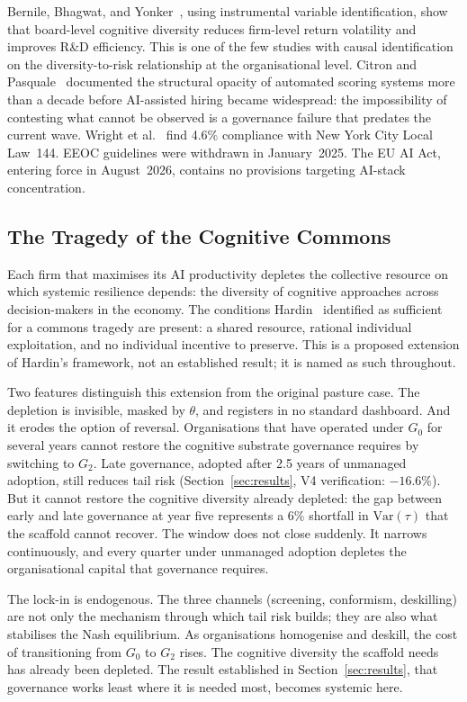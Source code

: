 \documentclass[11pt,a4paper]{article}
\begin{document}
Bernile, Bhagwat, and Yonker~\cite{bernile_jfe_2018}, using instrumental
variable identification, show that board-level cognitive diversity reduces
firm-level return volatility and improves R\&D efficiency. This is one of
the few studies with causal identification on the diversity-to-risk
relationship at the organisational level. Citron and
Pasquale~\cite{citron_wlr_2014} documented the structural opacity of
automated scoring systems more than a decade before AI-assisted hiring
became widespread: the impossibility of contesting what cannot be observed
is a governance failure that predates the current
wave. Wright et al.~\cite{wright_facct_2024} find 4.6\% compliance with New
York City Local Law~144. EEOC guidelines were withdrawn in January~2025.
The EU AI Act, entering force in August~2026, contains no provisions
targeting AI-stack concentration.

\subsection{The Tragedy of the Cognitive Commons}

Each firm that maximises its AI productivity depletes the collective
resource on which systemic resilience depends: the diversity of cognitive
approaches across decision-makers in the economy. The conditions
Hardin~\cite{hardin_science_1968} identified as sufficient for a commons
tragedy are present: a shared resource, rational individual exploitation,
and no individual incentive to preserve. This is a proposed extension of
Hardin's framework, not an established result; it is named as such
throughout.

Two features distinguish this extension from the original pasture case.
The depletion is invisible, masked by $\theta$, and registers in no
standard dashboard. And it erodes the option of reversal. Organisations
that have operated under $G_0$ for several years cannot restore the
cognitive substrate governance requires by switching to $G_2$. Late
governance, adopted after 2.5 years of unmanaged adoption, still reduces
tail risk (Section~\ref{sec:results}, V4 verification: $-16.6\%$). But
it cannot restore the cognitive diversity already depleted: the gap between
early and late governance at year five represents a 6\% shortfall in
$\text{Var}(\tau)$ that the scaffold cannot recover. The window does not
close suddenly. It narrows continuously, and every quarter under unmanaged
adoption depletes the organisational capital that governance requires.

The lock-in is endogenous. The three channels (screening, conformism,
deskilling) are not only the mechanism through which tail risk builds; they
are also what stabilises the Nash equilibrium. As organisations homogenise
and deskill, the cost of transitioning from $G_0$ to $G_2$ rises. The
cognitive diversity the scaffold needs has already been depleted. The result
established in Section~\ref{sec:results}, that governance works least
where it is needed most, becomes systemic here.
\end{document}
